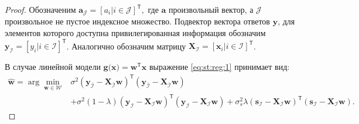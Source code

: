 \begin{proof}
Обозначеним $\mathbf{a}_{\mathcal{J}} = [a_i| i \in \mathcal{J}]^{\mathsf{T}},$ где $\mathbf{a}$ произвольный вектор, а $\mathcal{J}$ произвольное не пустое индексное множество. Подвектор вектора ответов $\mathbf{y}$, для элементов которого доступна привилегированная информация обозначим $\mathbf{y}_{\mathcal{I}} = [y_i| i \in \mathcal{I}]^{\mathsf{T}}$. Аналогично обозначим матрицу $\mathbf{X}_\mathcal{I}=[\mathbf{x}_{i}| i \in \mathcal{I}]^{\mathsf{T}}$.

В случае линейной модели $\mathbf{g}\bigr(\mathbf{x}\bigr) = \mathbf{w}^{\mathsf{T}}\mathbf{x}$ выражение \eqref{eq:st:reg:1} принимает вид:
\[
\label{eq:st:reg:2}
\begin{aligned}
\hat{\mathbf{w}} = \arg\min_{\mathbf{w}\in \mathcal{W}} &  \sigma^2\left(\mathbf{y}_{\bar{\mathcal{I}}}-\mathbf{X}_{\bar{\mathcal{I}}}\mathbf{w}\right)^{\mathsf{T}}\left(\mathbf{y}_{\bar{\mathcal{I}}}-\mathbf{X}_{\bar{\mathcal{I}}}\mathbf{w}\right) \\
&+ \sigma^2\left(1-\lambda\right)\left(\mathbf{y}_{\mathcal{I}}-\mathbf{X}_{\mathcal{I}}\mathbf{w}\right)^{\mathsf{T}}\left(\mathbf{y}_{\mathcal{I}}-\mathbf{X}_{\mathcal{I}}\mathbf{w}\right) + \sigma^2_s\lambda\left(\mathbf{s}_{\mathcal{I}}-\mathbf{X}_{\mathcal{I}}\mathbf{w}\right)^{\mathsf{T}}\left(\mathbf{s}_{\mathcal{I}}-\mathbf{X}_{\mathcal{I}}\mathbf{w}\right).
\end{aligned}
\]


\end{proof}

